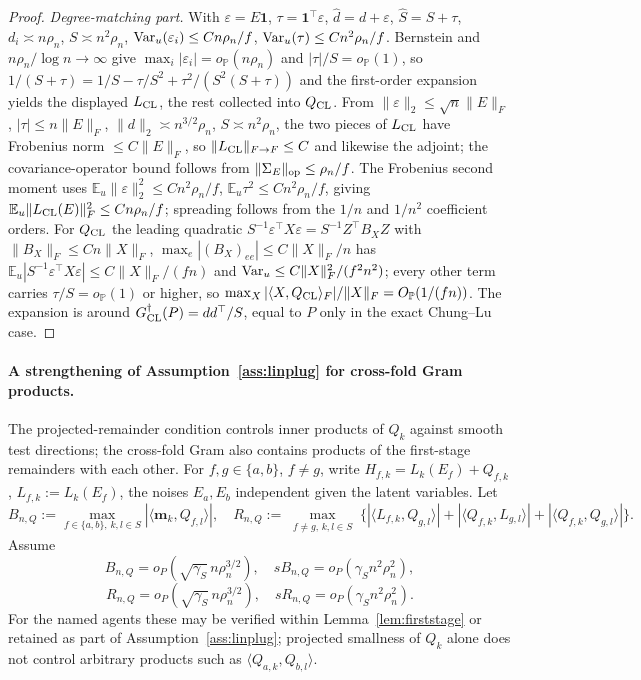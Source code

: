 \documentclass[12pt]{article}
\newcommand{\E}{\mathbb{E}}
\newcommand{\1}{\mathbf{1}}
\begin{document}
\begin{proof}
\smallskip\noindent\emph{Degree-matching part.}
With $\varepsilon=E\1$, $\tau=\1^\top\varepsilon$, $\widehat d=d+\varepsilon$, $\widehat S=S+\tau$,
$d_i\asymp n\rho_n$, $S\asymp n^2\rho_n$, ${\rm Var}_u(\varepsilon_i)\le Cn\rho_n/f$, ${\rm
Var}_u(\tau)\le Cn^2\rho_n/f$. Bernstein and $n\rho_n/\log n\to\infty$ give $\max_i|\varepsilon_i|=
o_{\mathbb P}(n\rho_n)$ and $|\tau|/S=o_{\mathbb P}(1)$, so $1/(S+\tau)=1/S-\tau/S^2+\tau^2/(S^2(S+\tau))$
and the first-order expansion yields the displayed $L_{\rm CL}$, the rest collected into $Q_{\rm
CL}$. From $\|\varepsilon\|_2\le\sqrt n\|E\|_F$, $|\tau|\le n\|E\|_F$, $\|d\|_2\asymp n^{3/2}\rho_n$,
$S\asymp n^2\rho_n$, the two pieces of $L_{\rm CL}$ have Frobenius norm $\le C\|E\|_F$, so $\|L_{\rm
CL}\|_{F\to F}\le C$ and likewise the adjoint; the covariance-operator bound follows from
$\|\Sigma_E\|_{\rm op}\le\rho_n/f$. The Frobenius second moment uses $\E_u\|\varepsilon\|_2^2\le
Cn^2\rho_n/f$, $\E_u\tau^2\le Cn^2\rho_n/f$, giving $\E_u\|L_{\rm CL}(E)\|_F^2\le Cn\rho_n/f$;
spreading follows from the $1/n$ and $1/n^2$ coefficient orders. For $Q_{\rm CL}$ the leading
quadratic $S^{-1}\varepsilon^\top X\varepsilon=S^{-1}Z^\top B_XZ$ with $\|B_X\|_F\le Cn\|X\|_F$,
$\max_e|(B_X)_{ee}|\le C\|X\|_F/n$ has $\E_u|S^{-1}\varepsilon^\top X\varepsilon|\le C\|X\|_F/(fn)$
and ${\rm Var}_u\le C\|X\|_F^2/(f^2n^2)$; every other term carries $\tau/S=o_{\mathbb P}(1)$ or
higher, so $\max_X|\langle X,Q_{\rm CL}\rangle_F|/\|X\|_F=O_{\mathbb P}(1/(fn))$. The expansion is
around $G_{\rm CL}^{\dagger}(P)=dd^\top/S$, equal to $P$ only in the exact Chung--Lu case.
\end{proof}

\paragraph{A strengthening of Assumption~\ref{ass:linplug} for cross-fold Gram products.}
The projected-remainder condition controls inner products of $Q_k$ against smooth test directions;
the cross-fold Gram also contains products of the first-stage remainders with each other. For
$f,g\in\{a,b\}$, $f\ne g$, write $H_{f,k}=L_k(E_f)+Q_{f,k}$, $L_{f,k}:=L_k(E_f)$, the noises
$E_a,E_b$ independent given the latent variables. Let
\[
B_{n,Q}:=\max_{f\in\{a,b\},\,k,l\in S}|\langle\mathbf m_k,Q_{f,l}\rangle|,\quad
R_{n,Q}:=\max_{\substack{f\ne g,\,k,l\in S}}\{|\langle L_{f,k},Q_{g,l}\rangle|+|\langle
Q_{f,k},L_{g,l}\rangle|+|\langle Q_{f,k},Q_{g,l}\rangle|\}.
\]
Assume
\[
        B_{n,Q}=o_P(\sqrt{\gamma_S}\,n\rho_n^{3/2}),\quad sB_{n,Q}=o_P(\gamma_S n^2\rho_n^2),
        \tag{A5.Q1}
\]
\[
        R_{n,Q}=o_P(\sqrt{\gamma_S}\,n\rho_n^{3/2}),\quad sR_{n,Q}=o_P(\gamma_S n^2\rho_n^2).
        \tag{A5.Q2}
\]
For the named agents these may be verified within Lemma~\ref{lem:firststage} or retained as part of
Assumption~\ref{ass:linplug}; projected smallness of $Q_k$ alone does not control arbitrary products
such as $\langle Q_{a,k},Q_{b,l}\rangle$.
\end{document}
